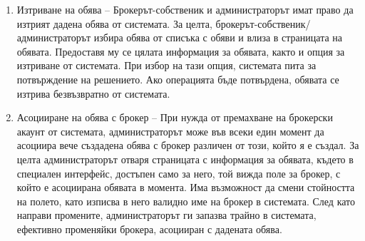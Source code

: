 \documentclass[a4paper]{article}
\begin{document}
\begin{enumerate}
{        направените промени, данните за обявата се запазват в системата.
}
\item {Изтриване на обява --
        Брокерът-собственик и администраторът имат право да изтрият дадена обява от
        системата. За целта, брокерът-собственик/администраторът избира обява от
        списъка с обяви и влиза в страницата на обявата. Предоставя му се цялата информация за обявата, както и опция за изтриване от системата. При избор на 
        тази опция, системата пита за потвърждение на решението. Ако операцията бъде
        потвърдена, обявата се изтрива безвъзвратно от системата. 
}
\item {Асоцииране на обява с брокер -- 
        При нужда от премахване на брокерски акаунт от системата,
        администраторът може във всеки един момент да асоциира вече създадена обява
        с брокер различен от този, който я е създал. За целта администраторът отваря
        страницата с информация за обявата, където в специален интерфейс, достъпен само
        за него, той вижда поле за брокер, с който е асоциирана обявата в момента.
        Има възможност да смени стойността на полето, като изписва в него валидно
        име на брокер в системата. След като направи промените, администраторът ги запазва
        трайно в системата, ефективно променяйки брокера, асоцииран с дадената обява.
}

\end{enumerate}
\end{document}
